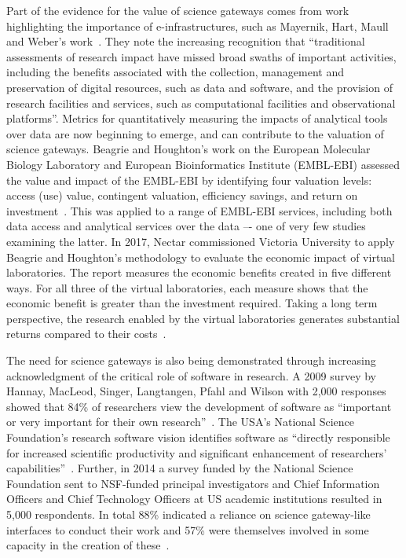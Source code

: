 \documentclass[review]{elsarticle}
\begin{document}
Part of the evidence for the value of science gateways comes from work highlighting the importance of e-infrastructures, such as Mayernik, Hart, Maull and Weber's work~\cite{Mayernik-34}. They note the increasing recognition that ``traditional assessments of research impact have missed broad swaths of important activities, including the benefits associated with the collection, management and preservation of digital resources, such as data and software, and the provision of research facilities and services, such as computational facilities and observational platforms''. 
Metrics for quantitatively measuring the impacts of analytical tools over data are now beginning to emerge, and can contribute to the valuation of science gateways. Beagrie and Houghton's work on the European Molecular Biology Laboratory  and European Bioinformatics Institute (EMBL-EBI) assessed the value and impact of the EMBL-EBI by identifying four valuation levels: access (use) value, contingent valuation, efficiency savings, and return on investment~\cite{Beagrie2016-35}. 
This was applied to a range of EMBL-EBI services, including both data access and analytical services over the data –- one of very few studies examining the latter. In 2017, Nectar commissioned Victoria University to apply Beagrie and Houghton's methodology to evaluate the economic impact of virtual laboratories. The report measures the economic benefits created in five different ways. For all three of the virtual laboratories, each measure shows that the economic benefit is greater than the investment required.  Taking a long term perspective, the research enabled by the virtual laboratories generates substantial returns compared to their costs~\cite{nectar-80}.

The need for science gateways is also being demonstrated through increasing acknowledgment of the critical role of software in research. A 2009 survey by Hannay, MacLeod, Singer, Langtangen, Pfahl and Wilson with 2,000 responses showed that 84\% of researchers view the development of software as ``important or very important for their own research''~\cite{Hannay2009-36}. The USA's National Science Foundation's research software vision identifies software as ``directly responsible for increased scientific productivity and significant enhancement of researchers' capabilities''~\cite{nsf-si-17}. 
Further, in 2014 a survey funded by the National Science Foundation sent to NSF-funded principal investigators and Chief Information Officers and Chief Technology Officers at US academic institutions resulted in  5,000 respondents. In total 88\% indicated a reliance on science gateway-like interfaces to conduct their work and 57\% were themselves involved in some capacity in the creation of these~\cite{Lawrence2015-37}.
\end{document}
